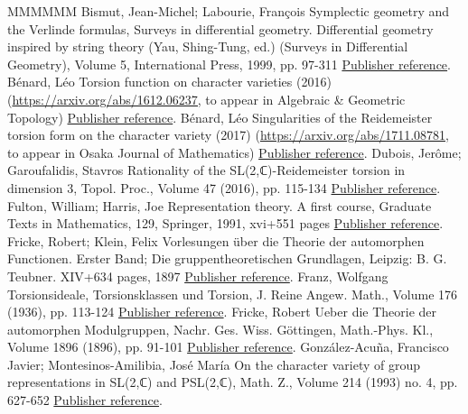 \documentclass[11pt]{article}
\theoremstyle{definition}
\numberwithin{equation}{section}
\numberwithin{figure}{section}
\numberwithin{table}{section}
\begin{document}
\begin{thebibliography}{MMMMMM}
 Bismut, Jean-Michel; Labourie, François Symplectic geometry and the Verlinde formulas, Surveys in differential geometry. Differential geometry inspired by string theory (Yau, Shing-Tung, ed.) (Surveys in Differential Geometry), Volume 5, International Press, 1999, pp. 97-311 \href{https://ahl.centre-mersenne.org/item/AHL_2020__3__341_0/#BL}{Publisher reference}.
 Bénard, Léo Torsion function on character varieties (2016) (\url{https://arxiv.org/abs/1612.06237,} to appear in Algebraic \& Geometric Topology) \href{https://ahl.centre-mersenne.org/item/AHL_2020__3__341_0/#Benard2}{Publisher reference}.
 Bénard, Léo Singularities of the Reidemeister torsion form on the character variety (2017) (\url{https://arxiv.org/abs/1711.08781,} to appear in Osaka Journal of Mathematics) \href{https://ahl.centre-mersenne.org/item/AHL_2020__3__341_0/#Benard1}{Publisher reference}.
 Dubois, Jerôme; Garoufalidis, Stavros Rationality of the SL(2,ℂ)-Reidemeister torsion in dimension 3, Topol. Proc., Volume 47 (2016), pp. 115-134 \href{https://ahl.centre-mersenne.org/item/AHL_2020__3__341_0/#DuboisGaroufalidis}{Publisher reference}.
 Fulton, William; Harris, Joe Representation theory. A first course, Graduate Texts in Mathematics, 129, Springer, 1991, xvi+551 pages \href{https://ahl.centre-mersenne.org/item/AHL_2020__3__341_0/#FultonHarris}{Publisher reference}.
 Fricke, Robert; Klein, Felix Vorlesungen über die Theorie der automorphen Functionen. Erster Band; Die gruppentheoretischen Grundlagen, Leipzig: B. G. Teubner. XIV+634 pages, 1897 \href{https://ahl.centre-mersenne.org/item/AHL_2020__3__341_0/#FrickeKlein}{Publisher reference}.
 Franz, Wolfgang Torsionsideale, Torsionsklassen und Torsion, J. Reine Angew. Math., Volume 176 (1936), pp. 113-124 \href{https://ahl.centre-mersenne.org/item/AHL_2020__3__341_0/#Franz37}{Publisher reference}.
 Fricke, Robert Ueber die Theorie der automorphen Modulgruppen, Nachr. Ges. Wiss. Göttingen, Math.-Phys. Kl., Volume 1896 (1896), pp. 91-101 \href{https://ahl.centre-mersenne.org/item/AHL_2020__3__341_0/#Fricke}{Publisher reference}.
 González-Acuña, Francisco Javier; Montesinos-Amilibia, José María On the character variety of group representations in SL(2,ℂ) and PSL(2,ℂ), Math. Z., Volume 214 (1993) no. 4, pp. 627-652 \href{https://ahl.centre-mersenne.org/item/AHL_2020__3__341_0/#AcunaMontesinos}{Publisher reference}.

\end{thebibliography}
\end{document}
